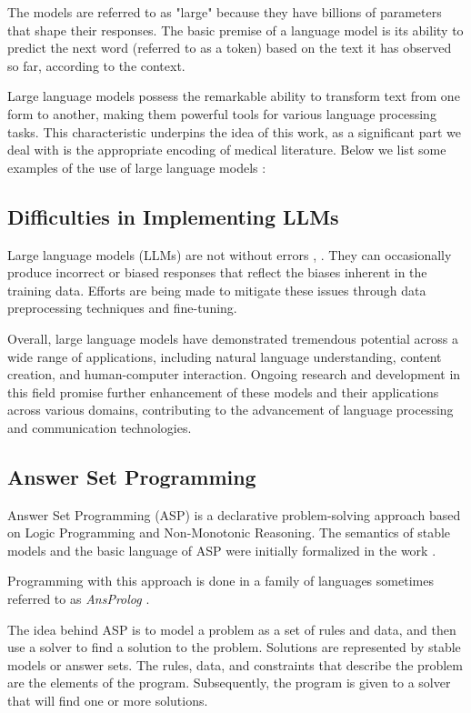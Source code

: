 \documentclass[10pt,leqno]{amsart}
\begin{document}
The models are referred to as "large" because they have billions of parameters that shape their responses. The basic premise of a language model is its ability to predict the next word (referred to as a token) based on the text it has observed so far, according to the context.

Large language models possess the remarkable ability to transform text from one form to another, making them powerful tools for various language processing tasks. This characteristic underpins the idea of this work, as a significant part we deal with is the appropriate encoding of medical literature. Below we list some examples of the use of large language models \cite{Paranjape2023}:

\subsection{Difficulties in Implementing LLMs}

Large language models (LLMs) are not without errors \cite{Raj2023}, \cite{Ruis2023}. They can occasionally produce incorrect or biased responses that reflect the biases inherent in the training data. Efforts are being made to mitigate these issues through data preprocessing techniques and fine-tuning.

Overall, large language models have demonstrated tremendous potential across a wide range of applications, including natural language understanding, content creation, and human-computer interaction. Ongoing research and development in this field promise further enhancement of these models and their applications across various domains, contributing to the advancement of language processing and communication technologies.

\subsection{Answer Set Programming}

Answer Set Programming (ASP) \cite{Eiter2009} is a declarative problem-solving approach based on Logic Programming and Non-Monotonic Reasoning. The semantics of stable models and the basic language of ASP were initially formalized in the work \cite{Gelfond2000}.

Programming with this approach is done in a family of languages sometimes referred to as \textit{AnsProlog} \cite{Gelfond2002}.

The idea behind ASP is to model a problem as a set of rules and data, and then use a solver to find a solution to the problem. Solutions are represented by stable models or answer sets. The rules, data, and constraints that describe the problem are the elements of the program. Subsequently, the program is given to a solver that will find one or more solutions.
\end{document}
